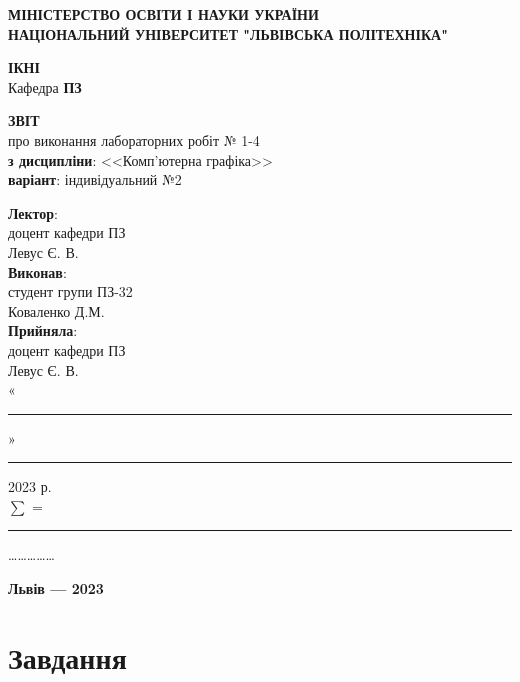 \documentclass[oneside,14pt]{extarticle}
\newcommand\subject{Комп'ютерна графіка}
\newcommand\lecturer{доцент кафедри ПЗ \\ Левус Є. В.}
\newcommand\teacher{доцент кафедри ПЗ \\ Левус Є. В.}
\newcommand\mygroup{ПЗ-32}
\newcommand\lab{1-4}
\begin{document}
\begin{normalsize}
	\begin{titlepage}
		\thispagestyle{empty}
		\begin{center}
			\textbf{МІНІСТЕРСТВО ОСВІТИ І НАУКИ УКРАЇНИ\\
				НАЦІОНАЛЬНИЙ УНІВЕРСИТЕТ "ЛЬВІВСЬКА ПОЛІТЕХНІКА"}
		\end{center}
		\begin{flushright}
			\textbf{ІКНІ}\\
			Кафедра \textbf{ПЗ}
		\end{flushright}
		\vspace{70pt}
		\begin{center}
			\textbf{ЗВІТ}\\
			про виконання лабораторних робіт № \lab\\
			\textbf{з дисципліни}: <<\subject>>\\
			\textbf{варіант}:  індивідуальний №2
		\end{center}
		\vspace{50pt}
		\begin{flushright}
			
			\textbf{Лектор}:\\
			\lecturer\\
			\vspace{10pt}
			\textbf{Виконав}:\\
			
			студент групи \mygroup\\
			Коваленко Д.М.\\
			\vspace{10pt}
			\textbf{Прийняла}:\\
			
			\teacher\\
			
			\vspace{28pt}
			«\rule{1cm}{0.15mm}» \rule{1.5cm}{0.15mm} 2023 р.\\
			$\sum$ = \rule{1cm}{0.15mm}……………\\
			
		\end{flushright}
		\vspace{\fill}
		\begin{center}
			\textbf{Львів — 2023}
		\end{center}
	\end{titlepage}

	\tableofcontents
	\pagebreak
	
	\section{Завдання}

\end{normalsize}
\end{document}
